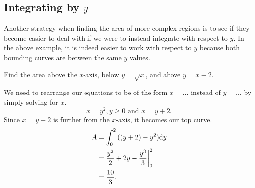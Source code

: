 \subsection{Integrating by $y$}
Another strategy when finding the area of more complex regions is to see if they become easier to deal with if we were to instead integrate with respect to $y$.
In the above example, it is indeed easier to work with respect to $y$ because both bounding curves are between the same $y$ values.
\begin{example}
	Find the area above the $x$-axis, below $y=\sqrt{x}$, and above $y=x-2$.
\end{example}
We need to rearrange our equations to be of the form $x=\ldots$ instead of $y=\ldots$ by simply solving for $x$.
\begin{equation*}
	x = y^2, y\geq 0 \text{ and } x = y+2.
\end{equation*}
\indent
Since $x=y+2$ is further from the $x$-axis, it becomes our top curve.
\begin{align*}
	A &= \int_{0}^{2}{((y+2)-y^2)\mathrm{d} y} \\
	&= \frac{y^2}{2} + 2y - \frac{y^3}{3} \biggr\rvert_0^2 \\
	&= \frac{10}{3}.
\end{align*}